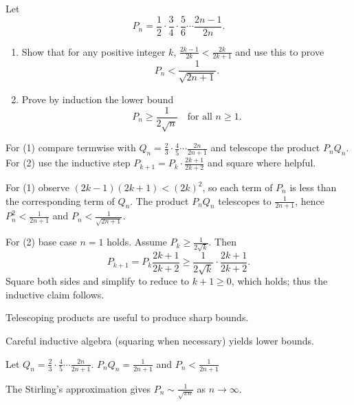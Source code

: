 \begin{problem}
Let
\[
P_n=\frac{1}{2}\cdot\frac{3}{4}\cdot\frac{5}{6}\cdots\frac{2n-1}{2n}.
\]

\begin{enumerate}
    \item Show that for any positive integer $k$, $\frac{2k-1}{2k}<\frac{2k}{2k+1}$ and use this to prove
    \[ P_n<\frac{1}{\sqrt{2n+1}}. \]
    \item Prove by induction the lower bound
    \[ P_n\ge\frac{1}{2\sqrt{n}}\quad\text{for all }n\ge1. \]
\end{enumerate}
\end{problem}

\begin{hint}
For (1) compare termwise with $Q_n=\frac{2}{3}\cdot\frac{4}{5}\cdots\frac{2n}{2n+1}$ and telescope the product $P_nQ_n$. For (2) use the inductive step
$P_{k+1}=P_k\cdot\frac{2k+1}{2k+2}$ and square where helpful.
\end{hint}

\begin{solution}
For (1) observe $(2k-1)(2k+1)<(2k)^2$, so each term of $P_n$ is less than the corresponding term of $Q_n$. The product $P_nQ_n$ telescopes to $\frac{1}{2n+1}$, hence $P_n^2<\frac{1}{2n+1}$ and $P_n<\frac{1}{\sqrt{2n+1}}$.

For (2) base case $n=1$ holds. Assume $P_k\ge\tfrac{1}{2\sqrt{k}}$. Then
\[P_{k+1}=P_k\frac{2k+1}{2k+2}\ge\frac{1}{2\sqrt{k}}\cdot\frac{2k+1}{2k+2}.
\]
Square both sides and simplify to reduce to $k+1\ge0$, which holds; thus the inductive claim follows.
\end{solution}

\begin{takeaways}
\item Telescoping products are useful to produce sharp bounds.
\item Careful inductive algebra (squaring when necessary) yields lower bounds.
\item Let $Q_n = \frac{2}{3} \cdot \frac{4}{5} \cdots \frac{2n}{2n+1}$. $P_n Q_n = \frac{1}{2n+1}$ and $P_n < \frac{1}{2n + 1}$
\item The Stirling's approximation gives $P_n \sim \frac{1}{\sqrt{\pi n}}$ as $n \to \infty$.
\end{takeaways}

